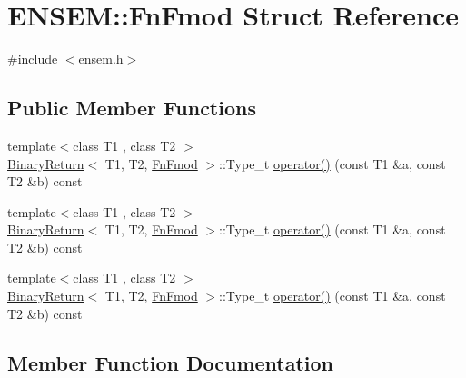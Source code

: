 \hypertarget{structENSEM_1_1FnFmod}{}\section{E\+N\+S\+EM\+:\+:Fn\+Fmod Struct Reference}
\label{structENSEM_1_1FnFmod}


{\ttfamily \#include $<$ensem.\+h$>$}

\subsection*{Public Member Functions}
\begin{DoxyCompactItemize}
\item 
{\footnotesize template$<$class T1 , class T2 $>$ }\\\mbox{\hyperlink{structENSEM_1_1BinaryReturn}{Binary\+Return}}$<$ T1, T2, \mbox{\hyperlink{structENSEM_1_1FnFmod}{Fn\+Fmod}} $>$\+::Type\+\_\+t \mbox{\hyperlink{structENSEM_1_1FnFmod_a3c0c1761f9aede2a2ec6382073727d3f}{operator()}} (const T1 \&a, const T2 \&b) const
\item 
{\footnotesize template$<$class T1 , class T2 $>$ }\\\mbox{\hyperlink{structENSEM_1_1BinaryReturn}{Binary\+Return}}$<$ T1, T2, \mbox{\hyperlink{structENSEM_1_1FnFmod}{Fn\+Fmod}} $>$\+::Type\+\_\+t \mbox{\hyperlink{structENSEM_1_1FnFmod_a3c0c1761f9aede2a2ec6382073727d3f}{operator()}} (const T1 \&a, const T2 \&b) const
\item 
{\footnotesize template$<$class T1 , class T2 $>$ }\\\mbox{\hyperlink{structENSEM_1_1BinaryReturn}{Binary\+Return}}$<$ T1, T2, \mbox{\hyperlink{structENSEM_1_1FnFmod}{Fn\+Fmod}} $>$\+::Type\+\_\+t \mbox{\hyperlink{structENSEM_1_1FnFmod_a3c0c1761f9aede2a2ec6382073727d3f}{operator()}} (const T1 \&a, const T2 \&b) const
\end{DoxyCompactItemize}


\subsection{Member Function Documentation}
\mbox{\label{structENSEM_1_1FnFmod_a3c0c1761f9aede2a2ec6382073727d3f}} 
